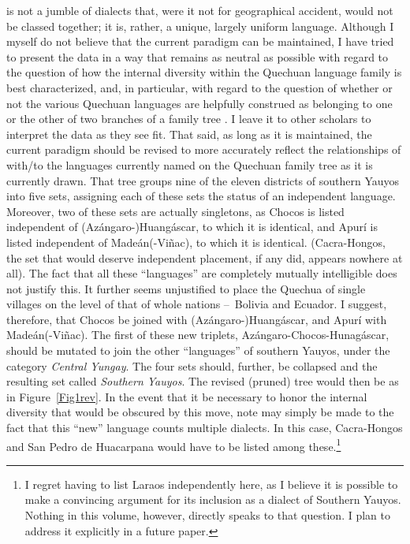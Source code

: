 \SYQ{} is not a jumble of dialects that, were it not for geographical accident, would not be classed together; it is, rather, a unique, largely uniform language. Although I myself do not believe that the current paradigm can be maintained, I have tried to present the data in a way that remains as neutral as possible with regard to the question of how the internal diversity within the Quechuan language family is best characterized, and, in particular, with regard to the question of whether or not the various Quechuan languages are helpfully construed as belonging to one or the other of two branches of a family tree \citep[See in particular][]{Adelaar08}. I leave it to other scholars to interpret the data as they see fit. That said, as long as it is maintained, the current paradigm should be revised to more accurately reflect the relationships of \SYQ{} with/to the languages currently named on the Quechuan family tree as it is currently drawn. That tree groups nine of the eleven districts of southern Yauyos into five sets, assigning each of these sets the status of an independent language. Moreover, two of these sets are actually singletons, as Chocos is listed independent of \mbox{(Azángaro-)}Huangáscar, to which it is identical, and Apurí is listed independent of Madeán(-Viñac), to which it is identical. (Cacra-Hongos, the set that would deserve independent placement, if any did, appears nowhere at all). The fact that all these “languages” are completely mutually intelligible does not justify this. It further seems unjustified to place the Quechua of single villages on the level of that of whole nations --~Bolivia and Ecuador. I suggest, therefore, that Chocos be joined with \mbox{(Azángaro-)}Huangáscar, and Apurí with Madeán(-Viñac). The first of these new triplets, Azángaro-Chocos-Hunagáscar, should be mutated to join the other “languages” of southern Yauyos, under the category \textit{Central Yungay}. The four sets should, further, be collapsed and the resulting set called \textit{Southern Yauyos}. The revised (pruned) tree would then be as in Figure~\ref{Fig1rev}. In the event that it be necessary to honor the internal diversity that would be obscured by this move, note may simply be made to the fact that this “new” language counts multiple dialects. In this case, Cacra-Hongos and San Pedro de Huacarpana would have to be listed among these.\footnote{I regret having to list Laraos independently here, as I believe it is possible to make a convincing argument for its inclusion as a dialect of Southern Yauyos. Nothing in this volume, however, directly speaks to that question. I plan to address it explicitly in a future paper.}

